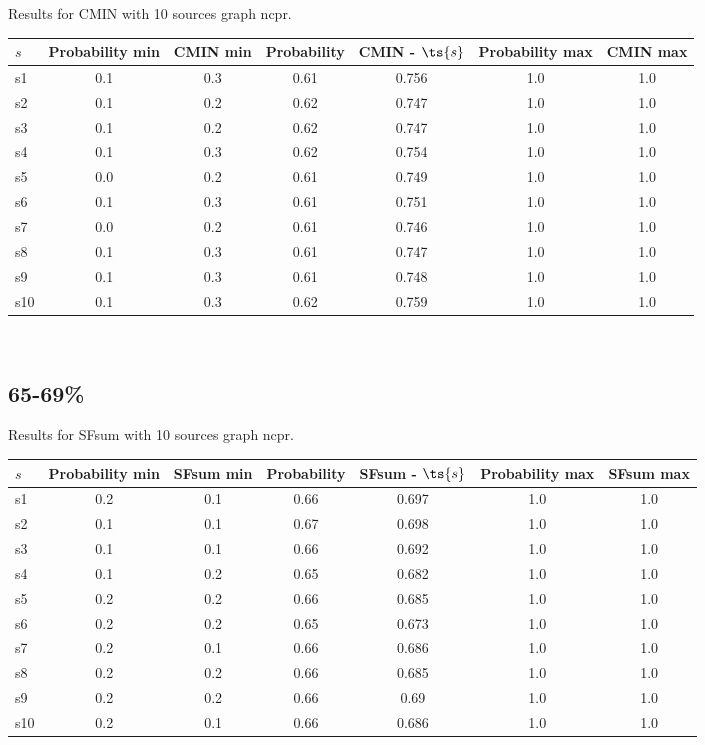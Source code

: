 \documentclass{article}
\begin{document}
\noindent Results for CMIN with 10 sources graph ncpr.

\noindent\begin{tabular}{|l|c|c|c|c|c|c|}
\hline
$s$& Probability min & CMIN min & Probability & CMIN - $\ts{s}$ & Probability max & CMIN max\\
\hline
s1 &0.1 & 0.3 & 0.61 & 0.756 & 1.0 & 1.0\\
\hline
s2 &0.1 & 0.2 & 0.62 & 0.747 & 1.0 & 1.0\\
\hline
s3 &0.1 & 0.2 & 0.62 & 0.747 & 1.0 & 1.0\\
\hline
s4 &0.1 & 0.3 & 0.62 & 0.754 & 1.0 & 1.0\\
\hline
s5 &0.0 & 0.2 & 0.61 & 0.749 & 1.0 & 1.0\\
\hline
s6 &0.1 & 0.3 & 0.61 & 0.751 & 1.0 & 1.0\\
\hline
s7 &0.0 & 0.2 & 0.61 & 0.746 & 1.0 & 1.0\\
\hline
s8 &0.1 & 0.3 & 0.61 & 0.747 & 1.0 & 1.0\\
\hline
s9 &0.1 & 0.3 & 0.61 & 0.748 & 1.0 & 1.0\\
\hline
s10 &0.1 & 0.3 & 0.62 & 0.759 & 1.0 & 1.0\\
\hline
\end{tabular}\\

\newpage

\subsection{65-69\%}

\noindent Results for SFsum with 10 sources graph ncpr.

\noindent\begin{tabular}{|l|c|c|c|c|c|c|}
\hline
$s$& Probability min & SFsum min & Probability & SFsum - $\ts{s}$ & Probability max & SFsum max\\
\hline
s1 &0.2 & 0.1 & 0.66 & 0.697 & 1.0 & 1.0\\
\hline
s2 &0.1 & 0.1 & 0.67 & 0.698 & 1.0 & 1.0\\
\hline
s3 &0.1 & 0.1 & 0.66 & 0.692 & 1.0 & 1.0\\
\hline
s4 &0.1 & 0.2 & 0.65 & 0.682 & 1.0 & 1.0\\
\hline
s5 &0.2 & 0.2 & 0.66 & 0.685 & 1.0 & 1.0\\
\hline
s6 &0.2 & 0.2 & 0.65 & 0.673 & 1.0 & 1.0\\
\hline
s7 &0.2 & 0.1 & 0.66 & 0.686 & 1.0 & 1.0\\
\hline
s8 &0.2 & 0.2 & 0.66 & 0.685 & 1.0 & 1.0\\
\hline
s9 &0.2 & 0.2 & 0.66 & 0.69 & 1.0 & 1.0\\
\hline
s10 &0.2 & 0.1 & 0.66 & 0.686 & 1.0 & 1.0\\
\hline
\end{tabular}\\
\end{document}
